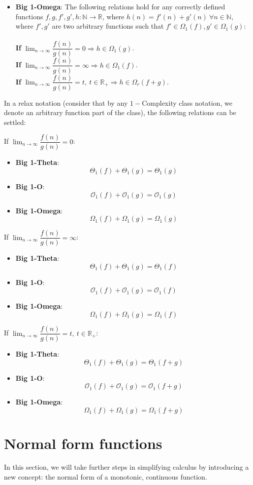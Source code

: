 \begin{itemize}
  \item \textbf{Big 1-Omega}: 
  The following relations hold for any correctly defined functions $f, g, f', g', h:\mathbb{N}\longrightarrow\mathbb{R}$, where $ h(n) = f'(n) + g'(n)\  \forall n \in \mathbb{N} $, where $f',g'$ are two arbitrary functions such that $ f' \in \Omega_{1}(f),  g' \in \Omega_{1}(g) $:  
  \\ \\
  \textbf{If} $ \lim_{n\to\infty} \dfrac{f(n)}{g(n)} = 0 \Rightarrow  h \in \Omega_{1}(g) $. \\

  \textbf{If} $ \lim_{n\to\infty} \dfrac{f(n)}{g(n)} = \infty \Rightarrow  h \in \Omega_{1}(f) $. \\
  \textbf{If} $ \lim_{n\to\infty} \dfrac{f(n)}{g(n)} = t, \ t \in \mathbb{R}_{+} \Rightarrow  h \in \Omega_{r} \left( f + g \right) $. \\

\end{itemize}


In a relax notation (consider that by any  $1-$Complexity class notation, we denote an arbitrary function part of the class), the following relations can be settled:


If $\lim_{n\to\infty} \dfrac{f(n)}{g(n)} = 0$:
\begin{itemize}
  \item \textbf{Big 1-Theta}: 
  \[  \Theta_{1}(f) + \Theta_{1}(g) = \Theta_{1}(g)\]
  \item \textbf{Big 1-O}: 
  \[  \mathcal{O}_{1}(f) + \mathcal{O}_{1}(g) = \mathcal{O}_{1}(g)\]
  \item \textbf{Big 1-Omega}: 
  \[  \Omega_{1}(f) + \Omega_{1}(g) = \Omega_{1}(g)\]
\end{itemize}


If $\lim_{n\to\infty} \dfrac{f(n)}{g(n)} = \infty$:
\begin{itemize}
  \item \textbf{Big 1-Theta}: 
  \[  \Theta_{1}(f) + \Theta_{1}(g) = \Theta_{1}(f)\]
  \item \textbf{Big 1-O}: 
  \[  \mathcal{O}_{1}(f) + \mathcal{O}_{1}(g) = \mathcal{O}_{1}(f)\]
  \item \textbf{Big 1-Omega}: 
  \[  \Omega_{1}(f) + \Omega_{1}(g) = \Omega_{1}(f)\]
\end{itemize}

If $\lim_{n\to\infty} \dfrac{f(n)}{g(n)} = t, \ t \in \mathbb{R}_{+}$:
\begin{itemize}
  \item \textbf{Big 1-Theta}: 
  \[  \Theta_{1}(f) + \Theta_{1}(g) = \Theta_{1}(f + g)\]
  \item \textbf{Big 1-O}: 
  \[  \mathcal{O}_{1}(f) + \mathcal{O}_{1}(g) = \mathcal{O}_{1}(f + g)\]
  \item \textbf{Big 1-Omega}: 
  \[  \Omega_{1}(f) + \Omega_{1}(g) = \Omega_{1}(f + g)\]
\end{itemize}

\section{Normal form functions}
In this section, we will take further steps in simplifying calculus by introducing a new concept: the normal form of a monotonic, continuous function.
